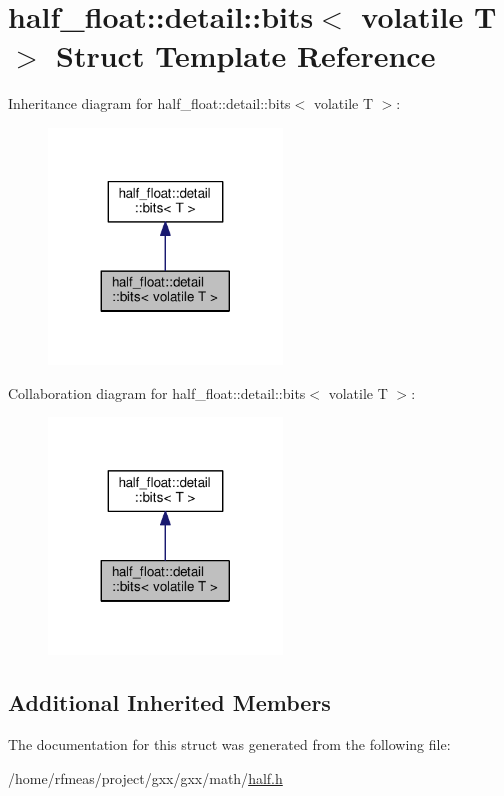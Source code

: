 \hypertarget{structhalf__float_1_1detail_1_1bits_3_01volatile_01T_01_4}{}\section{half\+\_\+float\+:\+:detail\+:\+:bits$<$ volatile T $>$ Struct Template Reference}
\label{structhalf__float_1_1detail_1_1bits_3_01volatile_01T_01_4}


Inheritance diagram for half\+\_\+float\+:\+:detail\+:\+:bits$<$ volatile T $>$\+:
\nopagebreak
\begin{figure}[H]
\begin{center}
\leavevmode
\includegraphics[width=176pt]{structhalf__float_1_1detail_1_1bits_3_01volatile_01T_01_4__inherit__graph}
\end{center}
\end{figure}


Collaboration diagram for half\+\_\+float\+:\+:detail\+:\+:bits$<$ volatile T $>$\+:
\nopagebreak
\begin{figure}[H]
\begin{center}
\leavevmode
\includegraphics[width=176pt]{structhalf__float_1_1detail_1_1bits_3_01volatile_01T_01_4__coll__graph}
\end{center}
\end{figure}
\subsection*{Additional Inherited Members}


The documentation for this struct was generated from the following file\+:\begin{DoxyCompactItemize}
\item 
/home/rfmeas/project/gxx/gxx/math/\hyperlink{half_8h}{half.\+h}\end{DoxyCompactItemize}
